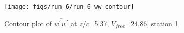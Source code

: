 \begin{figure}[H]
\centering
\texttt{[image: figs/run\_6/run\_6\_ww\_contour]}
\caption{Contour plot of $\overline{w^\prime w^\prime}$ at $z/c$=5.37, $V_{free}$=24.86, station 1.}
\label{fig:run_6_ww_contour}
\end{figure}


